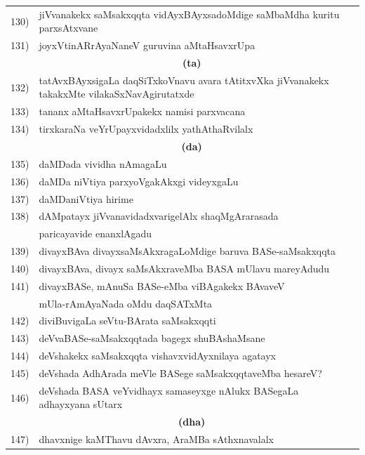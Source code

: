 {\begin{longtable}{@{}cp{7.4cm}r}
130) & jiVvanakekx saMsakxqqta vidAyxBAyxsadoMdige saMbaMdha kuritu parxsAtxvane & \pageref{page38}\\
131) & joyxVtinARrAyaNaneV guruvina aMtaHsavxrUpa & \pageref{80e}\\[0.3cm]
     &  \multicolumn{1}{c}{\textbf{(ta)}}  & \\[0.3cm]    
132) & tatAvxBAyxsigaLa daqSiTxkoVnavu avara tAtitxvXka jiVvanakekx takakxMte vilakaSxNavAgirutatxde & \pageref{page175}\\
133) & tananx aMtaHsavxrUpakekx namisi parxvacana & \pageref{80b}\\
134) & tirxkaraNa veYrUpayxvidadxlilx yathAthaRvilalx & \pageref{page69}\\[0.3cm]
     &  \multicolumn{1}{c}{\textbf{(da)}}  & \\[0.3cm]
135) & daMDada vividha nAmagaLu &  \pageref{page100}\\
136) & daMDa niVtiya parxyoVgakAkxgi videyxgaLu & \pageref{page99}\\
137) & daMDaniVtiya hirime & \pageref{page96} \\
138) & dAMpatayx jiVvanavidadxvarigelAlx shaqMgArarasada & \pageref{page221}\\
     & paricayavide enanxlAgadu & \pageref{page221}\\
139) & divayxBAva divayxsaMsAkxragaLoMdige baruva BASe-saMsakxqqta & \pageref{page10}\\
140) & divayxBAva, divayx saMsAkxraveMba BASA mUlavu mareyAdudu & \pageref{page15a}\\
141) & divayxBASe, mAnuSa BASe-eMba viBAgakekx BAvaveV &  \\
     & mUla-rAmAyaNada oMdu daqSATxMta & \pageref{page14}\\
142) & diviBuvigaLa seVtu-BArata saMsakxqqti & \pageref{page23}\\
143) & deVvaBASe-saMsakxqqtada bagegx shuBAshaMsane & \pageref{20b}\\
144) & deVshakekx saMsakxqqta vishavxvidAyxnilaya agatayx & \pageref{page37a}\\
145) & deVshada AdhArada meVle BASege saMsakxqqtaveMba hesareV? & \pageref{page7a}\\
146) & deVshada BASA veYvidhayx samaseyxge nAlukx BASegaLa adhayxyana sUtarx &\pageref{page44}\\[0.3cm]     
     &    \multicolumn{1}{c}{\textbf{(dha)}}  & \\[0.3cm] 
147) & dhavxnige kaMThavu dAvxra, AraMBa sAthxnavalalx & \pageref{page171}\\

\end{longtable}}
